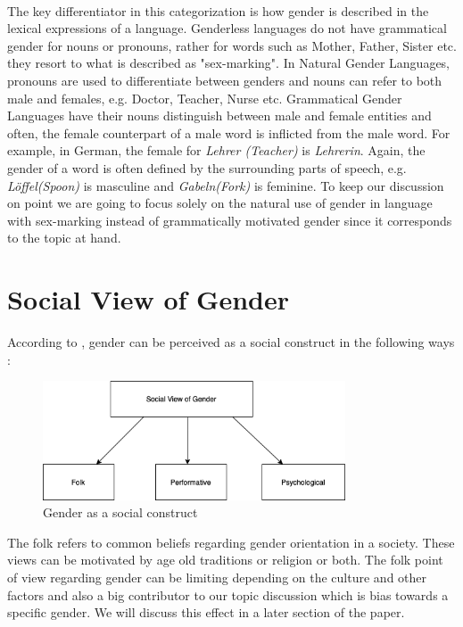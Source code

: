 \documentclass{article}
\begin{document}
\noindent
\\
The key differentiator in this categorization is how gender is described in the lexical expressions of a language. Genderless languages do not have grammatical gender for nouns or pronouns, rather for words such as Mother, Father, Sister etc. they resort to what is described as "sex-marking". In Natural Gender Languages, pronouns are used to differentiate between genders and nouns can refer to both male and females, e.g. Doctor, Teacher, Nurse etc. Grammatical Gender Languages have their nouns distinguish between male and female entities and often, the female counterpart of a male word is inflicted from the male word. For example, in German, the female for \textit{Lehrer (Teacher)} is \textit{Lehrerin}. Again, the gender of a word is often defined by the surrounding parts of speech, e.g. \textit{Löffel(Spoon)} is masculine and \textit{Gabeln(Fork)} is feminine. To keep our discussion on point we are going to focus solely on the natural use of gender in language with sex-marking instead of grammatically motivated gender since it corresponds to the topic at hand.

\section*{Social View of Gender}
According to \cite{larson2017gender}, gender can be perceived as a social construct in the following ways : 


\begin{figure}[H]
    \centering
    \includegraphics[width=0.8\textwidth]{Gender Social View.png}
    \caption{Gender as a social construct}
    \label{fig:gender_social_view}
\end{figure}

\noindent
The folk refers to common beliefs regarding gender orientation in a society. These views can be motivated by age old traditions or religion or both. The folk point of view regarding gender can be limiting depending on the culture and other factors and also a big contributor to our topic discussion which is bias towards a specific gender. We will discuss this effect in a later section of the paper. \\
\end{document}
